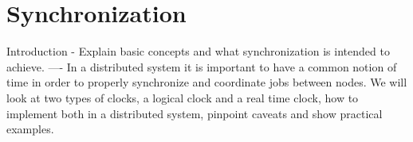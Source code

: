 \chapter{Synchronization} \label{ch:synchronization}

Introduction - Explain basic concepts and what synchronization is intended to achieve.
----
In a distributed system it is important to have a common notion of time in order to properly synchronize and coordinate jobs between nodes. We will look at two types of clocks, a logical clock and a real time clock, how to implement both in a distributed system, pinpoint caveats and show practical examples.




